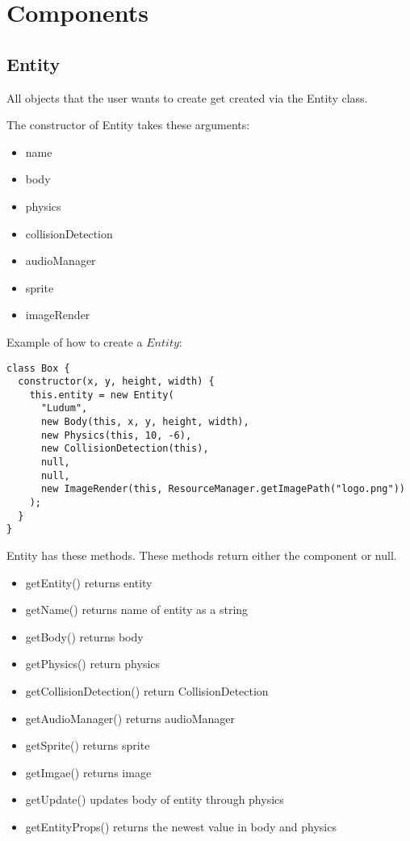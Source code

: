 \chapter{Components}
\section{Entity}

All objects that the user wants to create get created via the Entity class.



The constructor of Entity takes these arguments:

\begin{itemize}
	\item name
    \item body
    \item physics
    \item collisionDetection
    \item audioManager
    \item sprite
    \item imageRender
\end{itemize}


Example of how to create a $Entity$:

\begin{lstlisting}
class Box {
  constructor(x, y, height, width) {
    this.entity = new Entity(
      "Ludum",
      new Body(this, x, y, height, width),
      new Physics(this, 10, -6),
      new CollisionDetection(this),
      null,
      null,
      new ImageRender(this, ResourceManager.getImagePath("logo.png"))
    );
  }
}
\end{lstlisting}

Entity has these methods. These methods return either the component or null.

\begin{itemize}
	\item getEntity() returns entity
	\item getName() returns name of entity as a string
	\item getBody() returns body
	\item getPhysics() return physics
	\item getCollisionDetection() return CollisionDetection
	\item getAudioManager() returns audioManager
	\item getSprite() returns sprite
	\item getImgae() returns image	
	\item getUpdate() updates body of entity through physics
	\item getEntityProps() returns the newest value in body and physics
\end{itemize}


